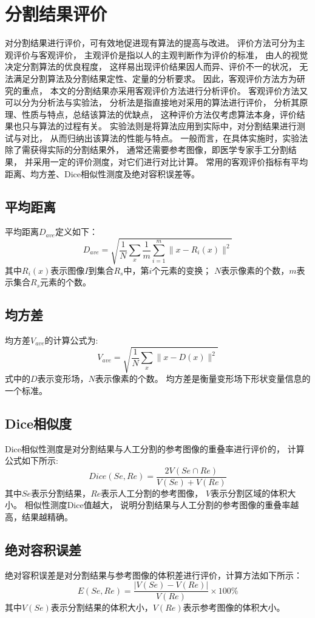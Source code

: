\section{分割结果评价}%
对分割结果进行评价，可有效地促进现有算法的提高与改进。
评价方法可分为主观评价与客观评价，
主观评价是指以人的主观判断作为评价的标准，
由人的视觉决定分割算法的优良程度，
这样易出现评价结果因人而异、评价不一的状况，
无法满足分割算法及分割结果定性、定量的分析要求。
因此，客观评价方法方为研究的重点，
本文的分割结果亦采用客观评价方法进行分析评价。
客观评价方法又可以分为分析法与实验法，
分析法是指直接地对采用的算法进行评价，
分析其原理、性质与特点，总结该算法的优缺点，
这种评价方法仅考虑算法本身，评价结果也只与算法的过程有关。
实验法则是将算法应用到实际中，对分割结果进行测试与对比，
从而归纳出该算法的性能与特点。
一般而言，在具体实施时，实验法除了需获得实际的分割结果外，
通常还需要参考图像，即医学专家手工分割结果，
并采用一定的评价测度，对它们进行对比计算。
常用的客观评价指标有平均距离、均方差、Dice相似性测度及绝对容积误差等。
\subsection{平均距离}
平均距离$D_{ave}$定义如下：
\begin{equation}
  D_{ave}=\sqrt{\frac{1}{N}\sum_x\frac{1}{m}\sum_{i=1}^m\lVert x-R_i(x)\rVert^2}
\end{equation}
其中$R_i(x)$表示图像$I$到集合$R_s$中，第$i$个元素的变换；
$N$表示像素的个数，$m$表示集合$R_s$元素的个数。
\subsection{均方差}
均方差$V_{ave}$的计算公式为:
\begin{equation}
  V_{ave}=\sqrt{\frac{1}{N}\sum_x\lVert x-D(x)\rVert^2}
\end{equation}
式中的$D$表示变形场，$N$表示像素的个数。
均方差是衡量变形场下形状变量信息的一个标准。
\subsection{Dice相似度}
Dice相似性测度是对分割结果与人工分割的参考图像的重叠率进行评价的，
计算公式如下所示:
\begin{equation}
  Dice(Se,Re)=\frac{2V(Se\cap Re)}{V(Se)+V(Re)}
\end{equation}
其中$Se$表示分割结果，$Re$表示人工分割的参考图像，
$V$表示分割区域的体积大小。
相似性测度Dice值越大，
说明分割结果与人工分割的参考图像的重叠率越高，结果越精确。
\subsection{绝对容积误差}
绝对容积误差是对分割结果与参考图像的体积差进行评价，计算方法如下所示：
\begin{equation}
  E(Se,Re)=\frac{\lvert V(Se)-V(Re)\rvert}{V(Re)}\times 100\%
\end{equation}
其中$V(Se)$表示分割结果的体积大小，$V(Re)$表示参考图像的体积大小。
